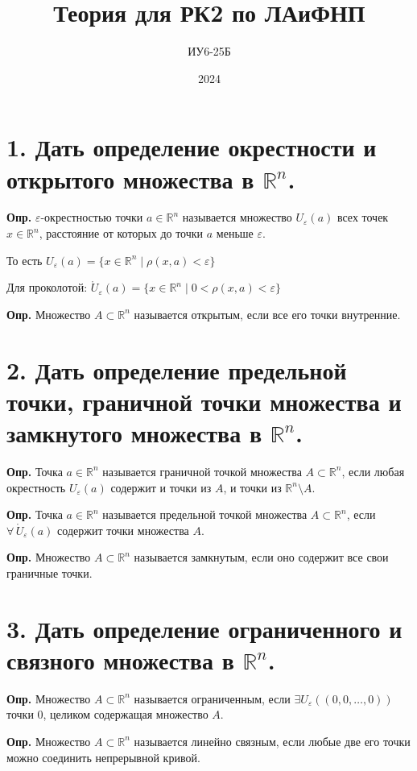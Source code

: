 \documentclass[11pt]{article}
\title{Теория для РК2 по ЛАиФНП}
\author{ИУ6-25Б}
\date{2024}
\begin{document}
\maketitle

\section*{1. Дать определение окрестности и открытого множества в $\mathbb{R}^{n}$.}
\par\textbf{Опр.} $\varepsilon$-окрестностью точки $a \in \mathbb{R}^{n}$ называется множество $U_{\varepsilon}(a)$ всех точек $x \in \mathbb{R}^{n}$, расстояние от которых до точки $a$ меньше $\varepsilon$.
\par То есть $U_{\varepsilon}(a) = \{ x \in \mathbb{R}^{n} \; | \; \rho(x, a) < \varepsilon \}$
\par Для проколотой: $\mathring{U}_{\varepsilon}(a) = \{ x \in \mathbb{R}^{n} \; | \; 0 < \rho(x, a) < \varepsilon \}$ 
\par\textbf{Опр.} Множество $A \subset \mathbb{R}^{n}$ называется открытым, если все его точки внутренние.
\section*{2. Дать определение предельной точки, граничной точки множества и замкнутого множества в $\mathbb{R}^{n}$.}
\par\textbf{Опр.} Точка $a \in \mathbb{R}^{n}$ называется граничной точкой множества $A \subset \mathbb{R}^{n}$, если любая окрестность $U_{\varepsilon}(a)$ содержит и точки из $A$, и точки из $\mathbb{R}^{n} \setminus A$.
\par\textbf{Опр.} Точка $a \in \mathbb{R}^{n}$ называется предельной точкой множества $A \subset \mathbb{R}^{n}$, если $\forall\,\mathring{U}_{\varepsilon}(a)$ содержит точки множества $A$.
\par\textbf{Опр.} Множество $A \subset \mathbb{R}^{n}$ называется замкнутым, если оно содержит все свои граничные точки.
\section*{3. Дать определение ограниченного и связного множества в $\mathbb{R}^{n}$.}
\par\textbf{Опр.} Множество $A \subset \mathbb{R}^{n}$ называется ограниченным, если $\exists U_{\varepsilon}((0, 0, \dots, 0))$ точки 0, целиком содержащая множество $A$.
\par\textbf{Опр.} Множество $A \subset \mathbb{R}^{n}$ называется линейно связным, если любые две его точки можно соединить непрерывной кривой.
\end{document}
